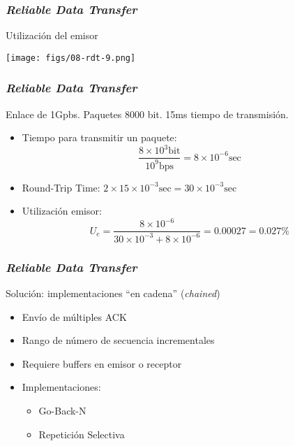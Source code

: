 \documentclass[letter]{beamer}
\begin{document}
\begin{frame}
  \frametitle{{\em Reliable Data Transfer}}

  Utilización del emisor
  \begin{center}
    \texttt{[image: figs/08-rdt-9.png]}
  \end{center}

\end{frame}
\begin{frame}
  \frametitle{{\em Reliable Data Transfer}}

  Enlace de 1Gpbs. Paquetes 8000 bit. 15ms tiempo de transmisión.
  \begin{itemize}
    \item Tiempo para transmitir un paquete:
      \[ \frac{8\times 10^3 \text{bit}}{10^9 \text{bps}} = 8 \times 10^{-6} \text{sec} \]
    \item Round-Trip Time: $2 \times 15 \times 10^{-3} \text{sec} = 30 \times 10^{-3} \text{sec}$
    \item Utilización emisor:
      \[ U_e = \frac{8 \times 10^{-6}}{30\times 10^{-3} + 8\times 10^{-6}} = 0.00027 = 0.027 \% \]
  \end{itemize}

\end{frame}


\begin{frame}
  \frametitle{{\em Reliable Data Transfer}}

  Solución: implementaciones ``en cadena'' ({\em chained})
  \begin{itemize}
    \item Envío de múltiples ACK
    \item Rango de número de secuencia incrementales
    \item Requiere buffers en emisor o receptor
    \item Implementaciones:
      \begin{itemize}
        \item Go-Back-N
        \item Repetición Selectiva
      \end{itemize}
  \end{itemize}
\end{frame}
\end{document}
